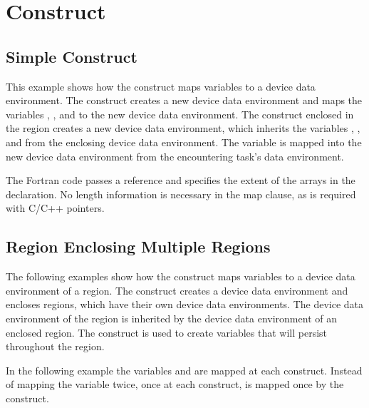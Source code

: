 \pagebreak
\section{  Construct}
\label{sec:target_data}

\subsection{Simple   Construct}
\label{subsec:target_data_simple}

This example shows how the   construct maps variables 
to a device data environment. The   construct creates 
a new device data environment and maps the variables , , and  to the new device 
data environment. The  construct enclosed in the  
 region creates a new device data environment, which inherits the 
variables , , and  from the enclosing device data environment. The variable 
 is mapped into the new device data environment from the encountering task's data 
environment.


The Fortran code passes a reference and specifies the extent of the arrays in the 
declaration. No length information is necessary in the map clause, as is required 
with C/C++ pointers.


\subsection{  Region Enclosing Multiple  Regions}
\label{subsec:target_data_multiregion}

The following examples show how the   construct maps 
variables to a device data environment of a  region. The  
 construct creates a device data environment and encloses  
regions, which have their own device data environments. The device data environment 
of the   region is inherited by the device data environment 
of an enclosed  region. The   construct 
is used to create variables that will persist throughout the   
region.

In the following example the variables  and  are mapped at each  
construct. Instead of mapping the variable  twice, once at each  
construct,  is mapped once by the   construct.

